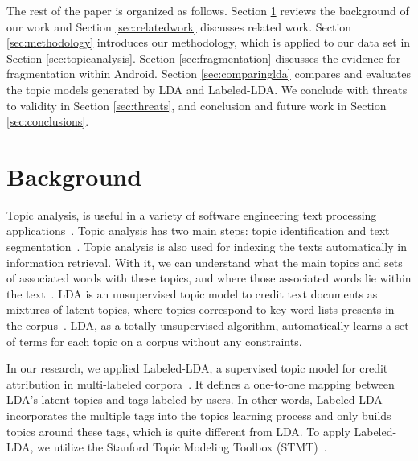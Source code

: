 \documentclass[10pt, conference, compsocconf]{IEEEtran}
\begin{document}
The rest of the paper is organized as follows. Section \ref{sec:background} reviews the
background of our work and Section \ref{sec:relatedwork} discusses related work. Section \ref{sec:methodology}
introduces our methodology, which is applied to our data set in
Section \ref{sec:topicanalysis}. Section \ref{sec:fragmentation}
discusses the evidence for fragmentation within Android. Section \ref{sec:comparinglda} compares and evaluates the topic models generated
by LDA and Labeled-LDA. 
We conclude with threats to validity in Section \ref{sec:threats},
and conclusion and future work in
Section \ref{sec:conclusions}.





\section{Background}
\label{sec:background}


Topic analysis,  is useful in a variety of software engineering text
processing applications~\cite{hindle9s}. 
Topic analysis has two main steps: topic identification and text
segmentation~\cite{li2003topic}. Topic analysis is also used for
indexing the texts automatically in information retrieval. %
With it, we can understand what the main topics and sets of associated
words with these topics, and where those associated words lie within
the text~\cite{li2003topic}. 
LDA is an unsupervised topic model to credit text documents as
mixtures of latent topics, where topics correspond to key word lists
presents in the corpus~\cite{ldawiki}.
LDA, as a totally unsupervised algorithm, automatically learns a set
of terms for each topic on a corpus without any constraints. 


In our research, we applied Labeled-LDA, 
a supervised topic model for credit
attribution in multi-labeled corpora~\cite{labeledlda}. It defines a
one-to-one mapping between LDA's latent topics and tags labeled by
users. In other words, Labeled-LDA incorporates the multiple tags into
the topics learning process and only builds topics around these tags,
which is quite different from LDA. 
To apply Labeled-LDA, we utilize the Stanford Topic Modeling Toolbox (STMT)~\cite{stmt}. 
\end{document}
